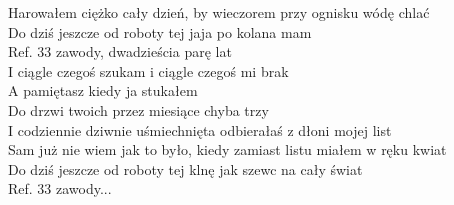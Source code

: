 \begin{flushleft}
Harowałem ciężko cały dzień, by wieczorem przy ognisku wódę chlać\\
Do dziś jeszcze od roboty tej jaja po kolana mam\\
\vskip 3mm
Ref. 33 zawody, dwadzieścia parę lat\\
\hspace{0.9cm}I ciągle czegoś szukam i ciągle czegoś mi brak\\
\vskip 3mm
A pamiętasz kiedy ja stukałem\\
Do drzwi twoich przez miesiące chyba trzy\\
I codziennie dziwnie uśmiechnięta odbierałaś z dłoni mojej list\\
Sam już nie wiem jak to było, kiedy zamiast listu miałem w ręku kwiat\\
Do dziś jeszcze od roboty tej klnę jak szewc na cały świat\\
\vskip 3mm
Ref. 33 zawody...

\end{flushleft}

\clearpage
